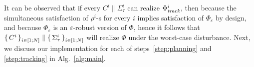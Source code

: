 It can be observed that if every  $C^i\parallel \Sigma_\tau^i$ can realize $\Phi_{\mathit{track}}^i$, then because the simultaneous satisfaction of $\rho^i$-s for every $i$ implies satisfaction of $\Phi_\varepsilon$ by design, and because $\Phi_\varepsilon$ is an $\varepsilon$-robust version of $\Phi$, hence it follows that $\set{C^i}_{i\in [1;N]}\parallel \set{\Sigma_\tau^i}_{i\in [1;N]}$ will realize $\Phi$ under the worst-case disturbance. Next, we discuss our implementation for each of steps~\ref{step:planning} and \ref{step:tracking} in Alg.~\ref{alg:main}.




